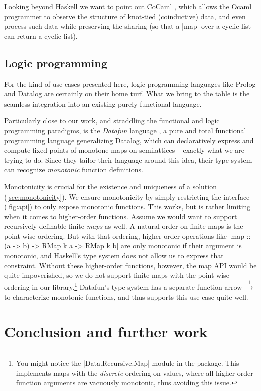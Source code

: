\documentclass[manuscript,review,screen,acmsmall]{acmart}
\begin{document}
Looking beyond Haskell we want to point out CoCaml \citep{cocaml}, which allows the Ocaml programmer to observe the structure of knot-tied (coinductive) data, and even process such data while preserving the sharing (so that a |map| over a cyclic list can return a cyclic list).


\subsection{Logic programming}

For the kind of use-cases presented here, logic programming languages like Prolog and Datalog are certainly on their home turf. What we bring to the table is the seamless integration into an existing purely functional language.

Particularly close to our work, and straddling the functional and logic programming paradigms, is the \emph{Datafun} language \citep{datafun}, a pure and total functional programming language generalizing Datalog, which can declaratively express and compute fixed points of monotone maps on semilattices -- exactly what we are trying to do. Since they tailor their language around this idea, their type system can recognize \emph{monotonic} function definitions.

Monotonicity is crucial for the existence and uniqueness of a solution (\cref{sec:monotonicity}). We ensure monotonicity by simply restricting the interface (\cref{fig:api}) to only expose monotonic functions. This works, but is rather limiting when it comes to higher-order functions. Assume we would want to support recursively-definable finite \emph{maps} as well. A natural order on finite maps is the point-wise ordering. But with that ordering, higher-order operations like |map :: (a -> b) -> RMap k a -> RMap k b| are only monotonic if their argument is monotonic, and Haskell's type system does not allow us to express that constraint. Without these higher-order functions, however, the map API would be quite impoverished, so we do not support finite maps with the point-wise ordering in our library.\footnote{You might notice the |Data.Recursive.Map| module in the package. This implements maps with the \emph{discrete} ordering on values, where all higher order function arguments are vacuously monotonic, thus avoiding this issue.} Datafun's type system has a separate function arrow $\xrightarrow{+}$ to characterize monotonic functions, and thus supports this use-case quite well.

\section{Conclusion and further work}
\end{document}
